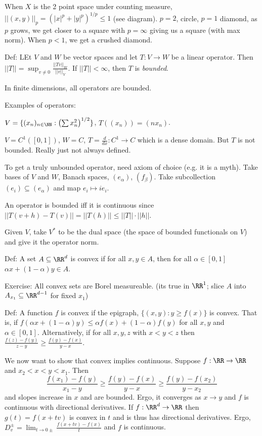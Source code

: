 \documentclass{../uva7310}
\begin{document}
When $X$ is the 2 point space under counting measure, $||(x,y)||_p= (|x|^p+|y|^p)^{1/p}\leq 1$ (see diagram). $p=2$, circle, $p=1$ diamond,
as $p$ grows, we get closer to a square with $p=\infty$ giving us a square (with max norm). When $p<1$, we get a crushed diamond.

Def: LEt $V$ and $W$ be vector spaces and let $T:V\rightarrow W$ be a linear operator. Then $||T||=\sup_{v\neq 0} \frac{||Tv||_W}{||v||_V}$.
If $||T||<\infty$, then $T$ is \textit{bounded}.

In finite dimensions, all operators are bounded.

Examples of operators: 

$V=\{(x_n)_{n\in\NN}: \left(\sum x_n^2\right)^{1/2}\}$, $T((x_n))=(nx_n)$.


$V=C^1([0,1])$, $W=C$, $T=\frac{d}{dx}:C^1\rightarrow C$ which is a dense domain. But $T$ is not bounded. Really just not always defined.

To get a truly unbounded operator, need axiom of choice (e.g. it is a myth). Take bases of $V$ and $W$, Banach spaces, $(e_\alpha)$,
$(f_\beta)$. Take subcollection $(e_i)\subseteq (e_\alpha)$ and map $e_i\mapsto ie_i$.

An operator is bounded iff it is continuous since $||T(v+h)-T(v)||=||T(h)||\leq ||T||\cdot ||h||$.

Given $V$, take $V^*$ to be the dual space (the space of bounded functionals on $V$) and give it the operator norm.

Def: A set $A\subseteq \RR^d$ is convex if for all $x,y\in A$, then for all $\alpha\in[0,1]$ $\alpha x+(1-\alpha)y\in A$.

Exercise: All convex sets are Borel measureable. (its true in $\RR^1$; slice $A$ into $A_{x_1}\subseteq\RR^{d-1}$ for fixed $x_1$)

Def: A function $f$ is convex if the epigraph, $\{(x,y):y\geq f(x)\}$ is convex. That is, if $f(\alpha x+(1-\alpha) y)\leq \alpha f(x)+(1-\alpha) f(y)$
for all $x,y$ and $\alpha\in[0,1]$. Alternatively, if for all $x,y,z$ with $x<y<z$ then $\frac{f(z)-f(y)}{z-y}\geq \frac{f(y)-f(x)}{y-x}$.

We now want to show that convex implies continuous. Suppose $f:\RR\rightarrow\RR$ and $x_2<x<y<x_1$. Then 
\[
    \frac{f(x_1)-f(y)}{x_1-y}\geq\frac{f(y)-f(x)}{y-x}\geq \frac{f(y)-f(x_2)}{y-x_2}
\]
and slopes increase in $x$ and are bounded. Ergo, it converges as $x\to y$ and $f$ is continuous with directional derivatives.
If $f:\RR^d\rightarrow\RR$ then $g(t)=f(x+tv)$ is convex in $t$ and is thus has directional derivatives.
Ergo, $D_v^\pm = \lim_{t\to 0\pm} \frac{f(x+tv)-f(x)}{t}$ and $f$ is continuous.
\end{document}
